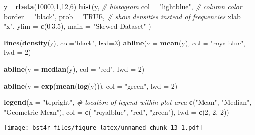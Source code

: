 \documentclass[12pt,]{article}
\newenvironment{Shaded}{\begin{snugshade}}{\end{snugshade}}
\newcommand{\KeywordTok}[1]{\textcolor[rgb]{0.13,0.29,0.53}{\textbf{#1}}}
\newcommand{\DataTypeTok}[1]{\textcolor[rgb]{0.13,0.29,0.53}{#1}}
\newcommand{\DecValTok}[1]{\textcolor[rgb]{0.00,0.00,0.81}{#1}}
\newcommand{\FloatTok}[1]{\textcolor[rgb]{0.00,0.00,0.81}{#1}}
\newcommand{\StringTok}[1]{\textcolor[rgb]{0.31,0.60,0.02}{#1}}
\newcommand{\CommentTok}[1]{\textcolor[rgb]{0.56,0.35,0.01}{\textit{#1}}}
\newcommand{\OtherTok}[1]{\textcolor[rgb]{0.56,0.35,0.01}{#1}}
\newcommand{\NormalTok}[1]{#1}
\theoremstyle{definition}
\theoremstyle{definition}
\theoremstyle{definition}
\theoremstyle{remark}
\begin{document}
\begin{Shaded}
\begin{Highlighting}[]
\NormalTok{y=}\StringTok{ }\KeywordTok{rbeta}\NormalTok{(}\DecValTok{10000}\NormalTok{,}\DecValTok{1}\NormalTok{,}\DecValTok{12}\NormalTok{,}\DecValTok{6}\NormalTok{)}
\KeywordTok{hist}\NormalTok{(y, }\CommentTok{# histogram}
 \DataTypeTok{col =} \StringTok{"lightblue"}\NormalTok{, }\CommentTok{# column color}
 \DataTypeTok{border =} \StringTok{"black"}\NormalTok{, }
 \DataTypeTok{prob =} \OtherTok{TRUE}\NormalTok{, }\CommentTok{# show densities instead of frequencies}
 \DataTypeTok{xlab =} \StringTok{"x"}\NormalTok{,}
 \DataTypeTok{ylim =} \KeywordTok{c}\NormalTok{(}\DecValTok{0}\NormalTok{,}\FloatTok{3.5}\NormalTok{),}
 \DataTypeTok{main =} \StringTok{"Skewed Dataset"}
\NormalTok{ )}

\KeywordTok{lines}\NormalTok{(}\KeywordTok{density}\NormalTok{(y), }\DataTypeTok{col=}\StringTok{'black'}\NormalTok{, }\DataTypeTok{lwd=}\DecValTok{3}\NormalTok{)}
\KeywordTok{abline}\NormalTok{(}\DataTypeTok{v =} \KeywordTok{mean}\NormalTok{(y),}
 \DataTypeTok{col =} \StringTok{"royalblue"}\NormalTok{,}
 \DataTypeTok{lwd =} \DecValTok{2}\NormalTok{)}

\KeywordTok{abline}\NormalTok{(}\DataTypeTok{v =} \KeywordTok{median}\NormalTok{(y),}
 \DataTypeTok{col =} \StringTok{"red"}\NormalTok{,}
 \DataTypeTok{lwd =} \DecValTok{2}\NormalTok{)}

\KeywordTok{abline}\NormalTok{(}\DataTypeTok{v =} \KeywordTok{exp}\NormalTok{(}\KeywordTok{mean}\NormalTok{(}\KeywordTok{log}\NormalTok{(y))),}
 \DataTypeTok{col =} \StringTok{"green"}\NormalTok{,}
 \DataTypeTok{lwd =} \DecValTok{2}\NormalTok{)}



\KeywordTok{legend}\NormalTok{(}\DataTypeTok{x =} \StringTok{"topright"}\NormalTok{, }\CommentTok{# location of legend within plot area}
 \KeywordTok{c}\NormalTok{(}\StringTok{"Mean"}\NormalTok{, }\StringTok{"Median"}\NormalTok{, }\StringTok{"Geometric Mean"}\NormalTok{),}
 \DataTypeTok{col =} \KeywordTok{c}\NormalTok{( }\StringTok{"royalblue"}\NormalTok{, }\StringTok{"red"}\NormalTok{, }\StringTok{"green"}\NormalTok{),}
 \DataTypeTok{lwd =} \KeywordTok{c}\NormalTok{(}\DecValTok{2}\NormalTok{, }\DecValTok{2}\NormalTok{, }\DecValTok{2}\NormalTok{))}
\end{Highlighting}
\end{Shaded}

\texttt{[image: bst4r\_files/figure-latex/unnamed-chunk-13-1.pdf]}
\end{document}
